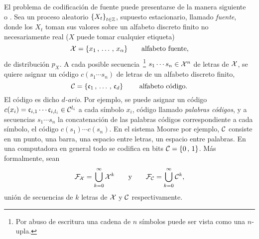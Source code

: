
\label{Ssec:SZ:Codificacion}

El  problema  de  codificaci\'on  de  fuente  puede  presentarse  de  la  manera
siguiente~\cite[cap.~5]{CovTho06}  o   \cite[cap.~13]{Rio07}.   Sea  un  proceso
aleatorio $\left\{  X_t \right\}_{t \in \mathbb{Z}}$,  supuesto estacionario, llamado
{\it  fuente}, donde  los $X_t$  toman sus  valores sobre  un  alfabeto discreto
finito no necesariamente real ($X$ puede tomar cualquier etiqueta)
%
\[
\mathcal{X} = \{ x_1 \, , \, \ldots \, , \, x_\alpha \} \qquad \mbox{alfabeto fuente},
\]
%
de  distribuci\'on  $p_X$.   A  cada posible  secuencia~\footnote{Por  abuso  de
  escritura una  cadena de  $n$ s\'imbolos puede  ser vista como  una $n$-upla.}
$s_1  \cdots s_n \in  \mathcal{X}^n$ de  letras de  $\mathcal{X}$, se  quiere asignar  un c\'odigo
$c(s_1 \cdots s_n)$ de letras de un alfabeto discreto finito,
%
\[
\mathcal{C} = \{ \mathfrak{c}_1 \, , \, \ldots \, , \, \mathfrak{c}_d \} \qquad \mbox{ alfabeto c\'odigo}.
\]
%
El c\'odigo es dicho {\it $d$-ario}.   Por ejemplo, se puede asignar un c\'odigo
$c(x_i)  = \mathfrak{c}_{i,1}  \cdots  \mathfrak{c}_{i,l_i} \in  \mathcal{C}^{l_i}$  a cada  s\'imbolo $x_i$,
c\'odigo llamado  {\it palabras c\'odigos}, y  a secuencias $s_1  \cdots s_n$ la
concatenaci\'on de las palabras  c\'odigos correspondiente a cada s\'imbolo, \ie
el  c\'odigo $c(s_1) \cdots  c(s_n)$.  En  el sistema  Moorse por  ejemplo, $\mathcal{C}$
consiste en  un punto,  una barra,  una espacio entre  letras, un  espacio entre
palabras.  En una computadora en general todo  se codifica en bits $\mathcal{C} = \{ 0 \,
, \, 1\}$.  M\'as formalmente, sean
%
\[
\mathcal{F}_{\mathcal{X}}   =   \bigcup_{k=0}^{\infty}  \mathcal{X}^k   \qquad   \mbox{y}   \qquad  \mathcal{F}_{\mathcal{C}}   =
\bigcup_{k=0}^{\infty} \mathcal{C}^k,
\]
%
uni\'on  de  secuencias de  $k$  letras de  $\mathcal{X}$  y  $\mathcal{C}$ respectivamente.
%

